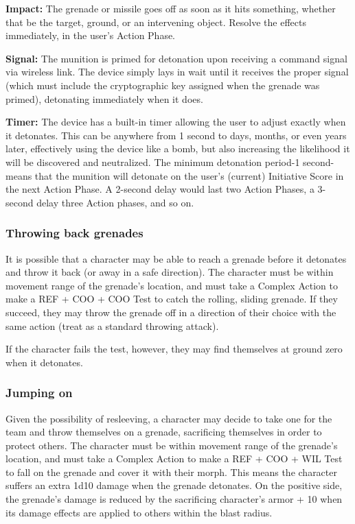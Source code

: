 \textbf{Impact:} The grenade or missile goes off as soon as it hits something, whether that be the target, ground, or an intervening object. Resolve the effects immediately, in the user’s Action Phase.

\textbf{Signal:} The munition is primed for detonation upon receiving a command signal via wireless link. The device simply lays in wait until it receives the proper signal (which must include the cryptographic key assigned when the grenade was primed), detonating immediately when it does.

\textbf{Timer:} The device has a built-in timer allowing the user to adjust exactly when it detonates. This can be anywhere from 1 second to days, months, or even years later, effectively using the device like a bomb, but also increasing the likelihood it will be discovered and neutralized. The minimum detonation period-1 second-means that the munition will detonate on the user’s (current) Initiative Score in the next Action Phase. A 2-second delay would last two Action Phases, a 3-second delay three Action phases, and so on.

\subsubsection{Throwing back grenades}

It is possible that a character may be able to reach a grenade before it detonates and throw it back (or away in a safe direction). The character must be within movement range of the grenade’s location, and must take a Complex Action to make a REF + COO + COO Test to catch the rolling, sliding grenade. If they succeed, they may throw the grenade off in a direction of their choice with the same action (treat as a standard throwing attack).

If the character fails the test, however, they may find themselves at ground zero when it detonates.

\subsubsection{Jumping on}

Given the possibility of resleeving, a character may decide to take one for the team and throw themselves on a grenade, sacrificing themselves in order to protect others. The character must be within movement range of the grenade’s location, and must take a Complex Action to make a REF + COO + WIL Test to fall on the grenade and cover it with their morph. This means the character suffers an extra 1d10 damage when the grenade detonates. On the positive side, the grenade’s damage is reduced by the sacrificing character’s armor + 10 when its damage effects are applied to others within the blast radius.

